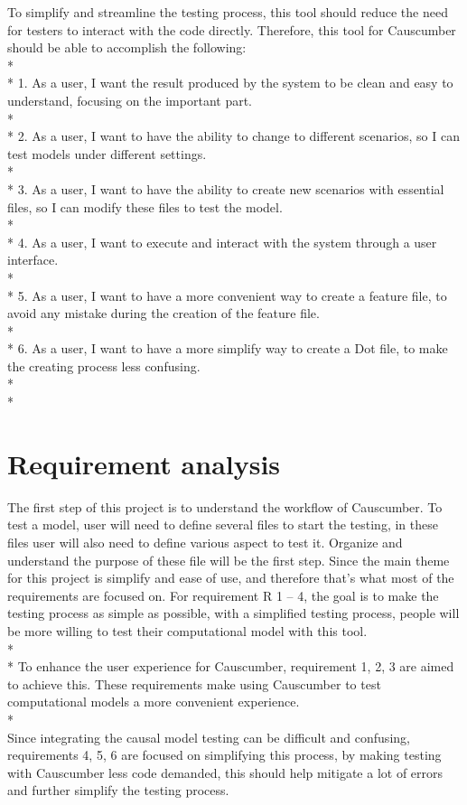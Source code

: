 To simplify and streamline the testing process, this tool should reduce the need for testers to interact with the code directly. Therefore, this tool for Causcumber should be able to accomplish the following:\\*
\\*
1. As a user, I want the result produced by the system to be clean and easy to understand, focusing on the important part.\\*
\\*
2. As a user, I want to have the ability to change to different scenarios, so I can test models under different settings.\\*
\\*
3. As a user, I want to have the ability to create new scenarios with essential files, so I can modify these files to test the model.\\*
\\*
4. As a user, I want to execute and interact with the system through a user interface.\\*
\\*
5. As a user, I want to have a more convenient way to create a feature file, to avoid any mistake during the creation of the feature file.\\*
\\*
6. As a user, I want to have a more simplify way to create a Dot file, to make the creating process less confusing. \\*
\\*

\section{Requirement analysis}
The first step of this project is to understand the workflow of Causcumber. To test a model, user will need to define several files to start the testing, in these files user will also need to define various aspect to test it. Organize and understand the purpose of these file will be the first step. Since the main theme for this project is simplify and ease of use, and therefore that’s what most of the requirements are focused on. For requirement R 1 – 4, the goal is to make the testing process as simple as possible, with a simplified testing process, people will be more willing to test their computational model with this tool. \\*\\*
To enhance the user experience for Causcumber, requirement 1, 2, 3 are aimed to achieve this. These requirements make using Causcumber to test computational models a more convenient experience. \\*\\
Since integrating the causal model testing can be difficult and confusing, requirements 4, 5, 6 are focused on simplifying this process, by making testing with Causcumber less code demanded, this should help mitigate a lot of errors and further simplify the testing process.



